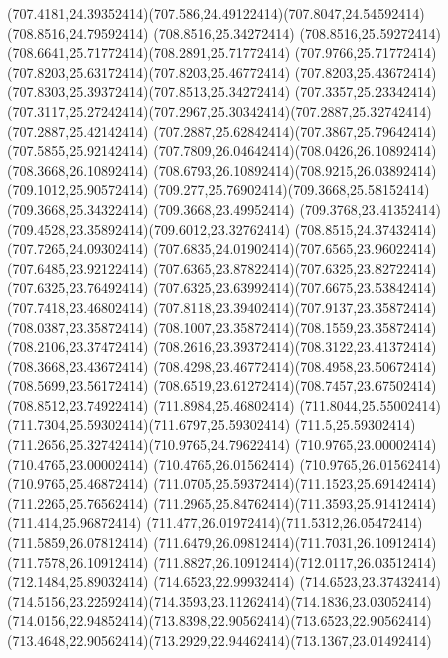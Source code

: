 {{	\curveto(707.4181,24.39352414)(707.586,24.49122414)(707.8047,24.54592414)
	\lineto(708.8516,24.79592414)
	\lineto(708.8516,25.34272414)
	\curveto(708.8516,25.59272414)(708.6641,25.71772414)(708.2891,25.71772414)
	\curveto(707.9766,25.71772414)(707.8203,25.63172414)(707.8203,25.46772414)
	\curveto(707.8203,25.43672414)(707.8303,25.39372414)(707.8513,25.34272414)
	\lineto(707.3357,25.23342414)
	\curveto(707.3117,25.27242414)(707.2967,25.30342414)(707.2887,25.32742414)
	\lineto(707.2887,25.42142414)
	\curveto(707.2887,25.62842414)(707.3867,25.79642414)(707.5855,25.92142414)
	\curveto(707.7809,26.04642414)(708.0426,26.10892414)(708.3668,26.10892414)
	\curveto(708.6793,26.10892414)(708.9215,26.03892414)(709.1012,25.90572414)
	\curveto(709.277,25.76902414)(709.3668,25.58152414)(709.3668,25.34322414)
	\lineto(709.3668,23.49952414)
	\curveto(709.3768,23.41352414)(709.4528,23.35892414)(709.6012,23.32762414)
	\closepath
	\moveto(708.8515,24.37432414)
	\lineto(707.7265,24.09302414)
	\curveto(707.6835,24.01902414)(707.6565,23.96022414)(707.6485,23.92122414)
	\curveto(707.6365,23.87822414)(707.6325,23.82722414)(707.6325,23.76492414)
	\curveto(707.6325,23.63992414)(707.6675,23.53842414)(707.7418,23.46802414)
	\curveto(707.8118,23.39402414)(707.9137,23.35872414)(708.0387,23.35872414)
	\curveto(708.1007,23.35872414)(708.1559,23.35872414)(708.2106,23.37472414)
	\curveto(708.2616,23.39372414)(708.3122,23.41372414)(708.3668,23.43672414)
	\curveto(708.4298,23.46772414)(708.4958,23.50672414)(708.5699,23.56172414)
	\curveto(708.6519,23.61272414)(708.7457,23.67502414)(708.8512,23.74922414)
	\closepath
	\moveto(711.8984,25.46802414)
	\curveto(711.8044,25.55002414)(711.7304,25.59302414)(711.6797,25.59302414)
	\curveto(711.5,25.59302414)(711.2656,25.32742414)(710.9765,24.79622414)
	\lineto(710.9765,23.00002414)
	\lineto(710.4765,23.00002414)
	\lineto(710.4765,26.01562414)
	\lineto(710.9765,26.01562414)
	\lineto(710.9765,25.46872414)
	\curveto(711.0705,25.59372414)(711.1523,25.69142414)(711.2265,25.76562414)
	\curveto(711.2965,25.84762414)(711.3593,25.91412414)(711.414,25.96872414)
	\curveto(711.477,26.01972414)(711.5312,26.05472414)(711.5859,26.07812414)
	\curveto(711.6479,26.09812414)(711.7031,26.10912414)(711.7578,26.10912414)
	\curveto(711.8827,26.10912414)(712.0117,26.03512414)(712.1484,25.89032414)
	\closepath
	\moveto(714.6523,22.99932414)
	\lineto(714.6523,23.37432414)
	\curveto(714.5156,23.22592414)(714.3593,23.11262414)(714.1836,23.03052414)
	\curveto(714.0156,22.94852414)(713.8398,22.90562414)(713.6523,22.90562414)
	\curveto(713.4648,22.90562414)(713.2929,22.94462414)(713.1367,23.01492414)
}}

